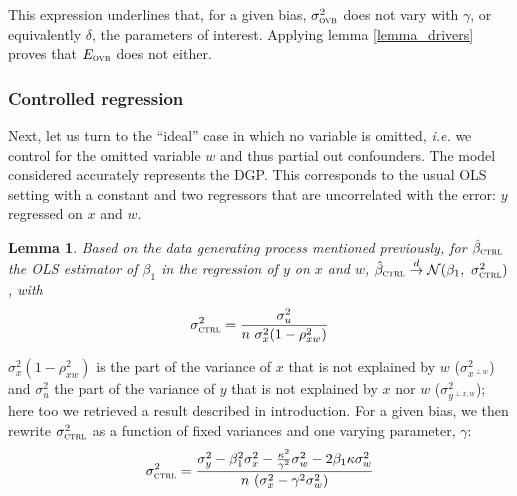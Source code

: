 \documentclass[usletter, 12pt]{article}
\newtheorem{lemma}{Lemma}
\begin{document}
			 This expression underlines that, for a given bias,  $\sigma_{\textsc{ovb}}^{2}$ does not vary with $\gamma$, or equivalently $\delta$, the parameters of interest. Applying lemma \ref{lemma_drivers} proves that $E_{\textsc{ovb}}$ does not either.

			
			\subsubsection{Controlled regression}
			
				Next, let us turn to the ``ideal'' case in which no variable is omitted, \textit{i.e.} we control for the omitted variable $w$ and thus partial out confounders. The model considered accurately represents the DGP.
%				
				This corresponds to the usual OLS setting with a constant and two regressors that are uncorrelated with the error: $y$ regressed on $x$ and $w$.
						
				\begin{lemma}\label{lemma_ctrl}
					Based on the data generating process mentioned previously, for $\hat{\beta}_{\textsc{ctrl}}$ the OLS estimator of $\beta_{1}$ in the regression of $y$ on $x$ and $w$, $\hat{\beta}_{\textsc{ctrl}} \overset{d}{\to} \mathcal{N}(\beta_{1}, \ \sigma_{\textsc{ctrl}}^{2})$, with
					\[
						\sigma_{\textsc{ctrl}}^{2} = \dfrac{\sigma_{u}^{2}}{n \ \sigma_{x}^{2} (1 - \rho_{xw}^{2})}
					\]
				\end{lemma}
				
				$\sigma_{x}^{2} (1 - \rho_{xw}^{2})$ is the part of the variance of $x$ that is not explained by $w$ ($\sigma^{2}_{x^{\perp w}}$) and $\sigma_{u}^{2}$ the part of the variance of $y$ that is not explained by $x$ nor $w$ ($\sigma^{2}_{y^{\perp x, w}}$); here too we retrieved a result described in introduction. For a given bias, we then rewrite $\sigma_{\textsc{ctrl}}^{2}$ as a function of fixed variances and one varying parameter, $\gamma$:
				~
				\[
					\sigma_{\textsc{ctrl}}^{2} = \dfrac{\sigma_{y}^{2} - \beta_{1}^{2}\sigma_{x}^{2} - \frac{\kappa^{2}}{\gamma^{2}}\sigma_{w}^{2} - 2\beta_{1}\kappa \sigma_{w}^{2}}{n \ (\sigma_{x}^{2}  - \gamma^{2} \sigma_{w}^{2})}
				\]
				
\end{document}
